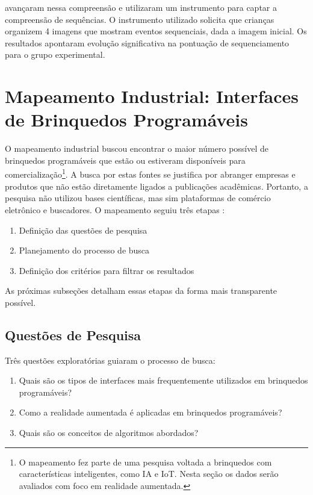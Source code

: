 { avançaram nessa compreensão e utilizaram um instrumento para captar a compreensão de sequências. O instrumento utilizado solicita que crianças organizem 4 imagens que mostram eventos sequenciais, dada a imagem inicial. Os resultados apontaram evolução significativa na pontuação de sequenciamento para o grupo experimental.

\section{Mapeamento Industrial: Interfaces de Brinquedos Programáveis}
\label{secao_mapeamento_industrial}

O mapeamento industrial buscou encontrar o maior número possível de brinquedos programáveis que estão ou estiveram disponíveis para comercialização\footnote{O mapeamento fez parte de uma pesquisa voltada a brinquedos com características inteligentes, como IA e IoT. Nesta seção os dados serão avaliados com foco em realidade aumentada.}. A busca por estas fontes se justifica por abranger empresas e produtos que não estão diretamente ligados a publicações acadêmicas. Portanto, a pesquisa não utilizou bases científicas, mas sim plataformas de comércio eletrônico e buscadores. O mapeamento seguiu três etapas \cite{cooper_alice:_2000}:
\begin{enumerate}
    \item Definição das questões de pesquisa
    \item Planejamento do processo de busca
    \item Definição dos critérios para filtrar os resultados
\end{enumerate}

As próximas subseções detalham essas etapas da forma mais transparente possível.

\subsection{Questões de Pesquisa}

Três questões exploratórias guiaram o processo de busca:

\begin{enumerate}
    \item Quais são os tipos de interfaces mais frequentemente utilizados em brinquedos programáveis?
    \item Como a realidade aumentada é aplicadas em brinquedos programáveis?
    \item Quais são os conceitos de algoritmos abordados? 
\end{enumerate}

}
